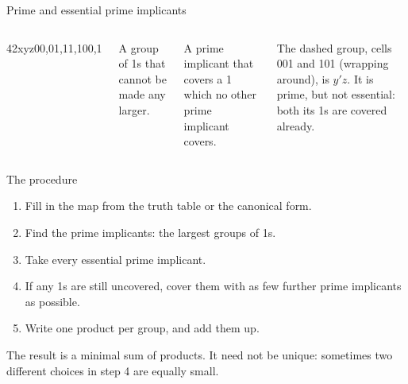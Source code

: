 \documentclass[10pt]{wosm-slides}
\newenvironment{kmapthree}
  {\begin{kmap}{4}{2}{xy}{z}{00,01,11,10}{0,1}}
  {\end{kmap}}
\newcommand*\threeindices{%
  \kindices{0}{0,1}\kindices{1}{2,3}\kindices{2}{6,7}\kindices{3}{4,5}}
\begin{document}
\begin{frame}{Prime and essential prime implicants}
  \begin{columns}[c, totalwidth=\textwidth]
      \centering
      \begin{kmapthree}
        \threeindices
      \end{kmapthree}
      \small
      \begin{definition}
        A group of 1s that cannot be made any larger.
      \end{definition}
      \begin{definition}
        A prime implicant that covers a 1 which no other prime implicant covers.
      \end{definition}
      The dashed group, cells 001 and 101 (wrapping around), is $y'z$. It is prime,
      but not essential: both its 1s are covered already.
  \end{columns}

  \medskip
\end{frame}

\begin{frame}{The procedure}
  \begin{enumerate}
    \item Fill in the map from the truth table or the canonical form.
    \item Find the prime implicants: the largest groups of 1s.
    \item Take every essential prime implicant.
    \item If any 1s are still uncovered, cover them with as few further prime
      implicants as possible.
    \item Write one product per group, and add them up.
  \end{enumerate}

  \bigskip
  \begin{remark}
    The result is a minimal sum of products. It need not be unique: sometimes two
    different choices in step 4 are equally small.
  \end{remark}
\end{frame}
\end{document}
